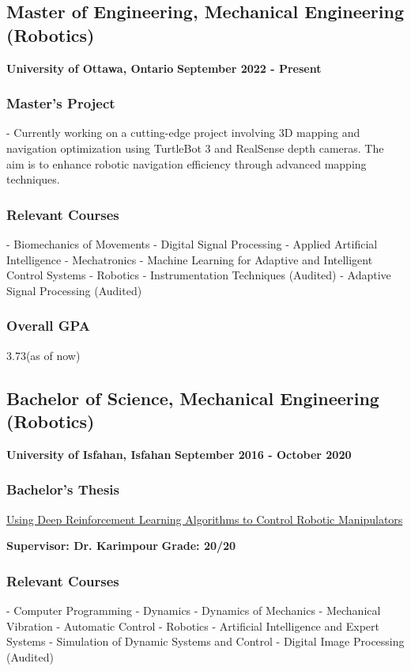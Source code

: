 \documentclass[a4paper]{article}
\begin{document}
\subsection{Master of Engineering, Mechanical Engineering (Robotics)}
{\bfseries\small University of Ottawa, Ontario}
\hfill
{\bfseries\small September 2022 - Present}
        
\subsubsection{Master's Project}
- Currently working on a cutting-edge project involving 3D mapping and navigation optimization using TurtleBot 3 and RealSense depth cameras. The aim is to enhance robotic navigation efficiency through advanced mapping techniques.
        
\subsubsection{Relevant Courses}
- Biomechanics of Movements
- Digital Signal Processing
- Applied Artificial Intelligence
- Mechatronics
- Machine Learning for Adaptive and Intelligent Control Systems
- Robotics
- Instrumentation Techniques (Audited)
- Adaptive Signal Processing (Audited)

\subsubsection{Overall GPA}
3.73(as of now)

\subsection{Bachelor of Science, Mechanical Engineering (Robotics)}
{\bfseries\small University of Isfahan, Isfahan}
\hfill
{\bfseries\small September 2016 - October 2020}
        
\subsubsection{Bachelor's Thesis}
\href{https://github.com/ake1999/aarm}{Using Deep Reinforcement Learning Algorithms to Control Robotic Manipulators} 
        
{\bfseries\small Supervisor: Dr. Karimpour}
\hfill
{\bfseries\small Grade: 20/20}
        
\subsubsection{Relevant Courses}
- Computer Programming
- Dynamics
- Dynamics of Mechanics
- Mechanical Vibration
- Automatic Control
- Robotics
- Artificial Intelligence and Expert Systems
- Simulation of Dynamic Systems and Control
- Digital Image Processing (Audited)
        
\end{document}
